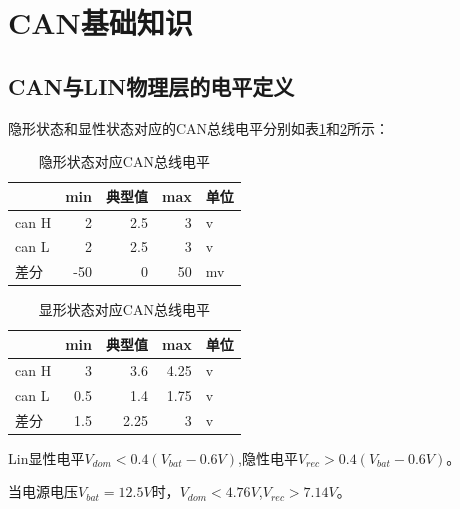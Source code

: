 \section{CAN基础知识}

\subsection{CAN与LIN物理层的电平定义}
隐形状态和显性状态对应的CAN总线电平分别如表\ref{tab:rec_can_level}和\ref{tab:dom_can_level}所示：
\begin{table}[htbp]
    \centering
    \caption{隐形状态对应CAN总线电平}
      \begin{tabular}{lrrrl}
        \toprule
            & \multicolumn{1}{l}{min} & \multicolumn{1}{l}{典型值} & \multicolumn{1}{l}{max} & 单位 \\
        \midrule
      can H & 2     & 2.5   & 3     & v \\
      can L & 2     & 2.5   & 3     & v \\
      差分    & -50   & 0     & 50    & mv \\
      \bottomrule
      \end{tabular}%
    \label{tab:rec_can_level}%
\end{table}%
  
\begin{table}[htbp]
    \centering
    \caption{显形状态对应CAN总线电平}
      \begin{tabular}{lrrrl}
        \toprule
            & \multicolumn{1}{l}{min} & \multicolumn{1}{l}{典型值} & \multicolumn{1}{l}{max} & 单位 \\
        \midrule
      can H & 3     & 3.6   & 4.25  & v \\
      can L & 0.5   & 1.4   & 1.75  & v \\
      差分    & 1.5   & 2.25  & 3     & v \\
      \bottomrule
      \end{tabular}%
    \label{tab:dom_can_level}%
\end{table}%
  
Lin显性电平$V_{dom}<0.4(V_{bat}-0.6V)$,隐性电平$V_{rec}>0.4(V_{bat}-0.6V)$。

当电源电压$V_{bat}=12.5V$时，$V_{dom}<4.76V$,$V_{rec}>7.14V$。


